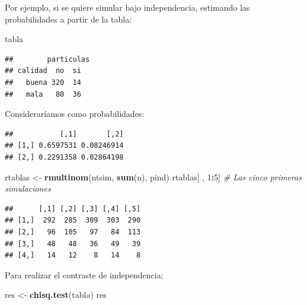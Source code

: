 \documentclass[]{book}
\newenvironment{Shaded}{\begin{snugshade}}{\end{snugshade}}
\newcommand{\KeywordTok}[1]{\textcolor[rgb]{0.13,0.29,0.53}{\textbf{#1}}}
\newcommand{\DataTypeTok}[1]{\textcolor[rgb]{0.13,0.29,0.53}{#1}}
\newcommand{\DecValTok}[1]{\textcolor[rgb]{0.00,0.00,0.81}{#1}}
\newcommand{\StringTok}[1]{\textcolor[rgb]{0.31,0.60,0.02}{#1}}
\newcommand{\CommentTok}[1]{\textcolor[rgb]{0.56,0.35,0.01}{\textit{#1}}}
\newcommand{\OperatorTok}[1]{\textcolor[rgb]{0.81,0.36,0.00}{\textbf{#1}}}
\newcommand{\NormalTok}[1]{#1}
\theoremstyle{definition}
\theoremstyle{definition}
\theoremstyle{definition}
\theoremstyle{remark}
\begin{document}
Por ejemplo, si se quiere simular bajo independencia, estimando las
probabilidades a partir de la tabla:

\begin{Shaded}
\begin{Highlighting}[]
\NormalTok{tabla}
\end{Highlighting}
\end{Shaded}

\begin{verbatim}
##        particulas
## calidad  no  si
##   buena 320  14
##   mala   80  36
\end{verbatim}

Consideraríamos como probabilidades:

\begin{Shaded}
\end{Shaded}

\begin{verbatim}
##           [,1]       [,2]
## [1,] 0.6597531 0.08246914
## [2,] 0.2291358 0.02864198
\end{verbatim}

\begin{Shaded}
\begin{Highlighting}[]
\NormalTok{rtablas <-}\StringTok{ }\KeywordTok{rmultinom}\NormalTok{(ntsim, }\KeywordTok{sum}\NormalTok{(n), pind)}
\NormalTok{rtablas[ , }\DecValTok{1}\OperatorTok{:}\DecValTok{5}\NormalTok{] }\CommentTok{# Las cinco primeras simulaciones}
\end{Highlighting}
\end{Shaded}

\begin{verbatim}
##      [,1] [,2] [,3] [,4] [,5]
## [1,]  292  285  309  303  290
## [2,]   96  105   97   84  113
## [3,]   48   48   36   49   39
## [4,]   14   12    8   14    8
\end{verbatim}

Para realizar el contraste de independencia:

\begin{Shaded}
\begin{Highlighting}[]
\NormalTok{res <-}\StringTok{ }\KeywordTok{chisq.test}\NormalTok{(tabla)}
\NormalTok{res}
\end{Highlighting}
\end{Shaded}
\end{document}
